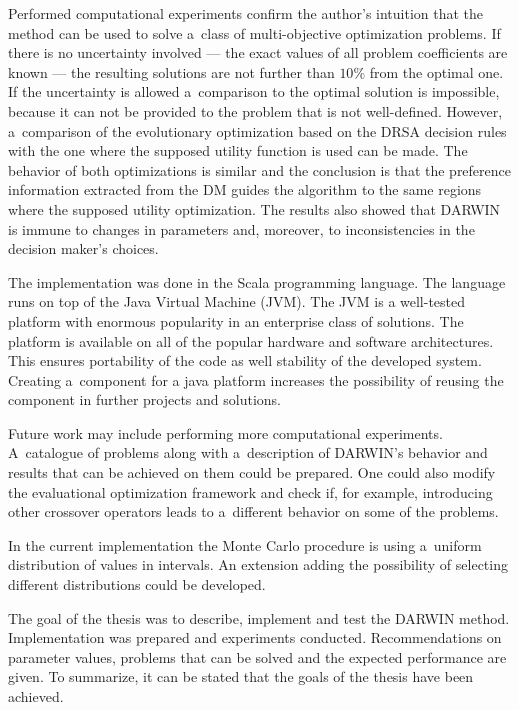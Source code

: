 Performed computational experiments confirm the author's intuition that the
method can be used to solve a~class of multi-objective optimization
problems. If there is no uncertainty involved --- the exact values of all
problem coefficients are known --- the resulting solutions are not further
than $10\%$ from the optimal one. If the uncertainty is allowed a~comparison
to the optimal solution is impossible, because it can not be provided to the
problem that is not well-defined. However, a~comparison of the evolutionary
optimization based on the DRSA decision rules with the one where the supposed
utility function is used can be made. The behavior of both optimizations is
similar and the conclusion is that the preference information extracted from
the DM guides the algorithm to the same regions where the supposed utility
optimization. The results also showed that DARWIN is immune to changes in
parameters and, moreover, to inconsistencies in the decision maker's choices.

The implementation was done in the Scala programming language. The language
runs on top of the Java Virtual Machine (JVM). The JVM is a well-tested
platform with enormous popularity in an enterprise class of solutions. The
platform is available on all of the popular hardware and software
architectures. This ensures portability of the code as well stability of the
developed system. Creating a~component for a java platform increases the
possibility of reusing the component in further projects and solutions.

Future work may include performing more computational experiments. A~catalogue
of problems along with a~description of DARWIN's behavior and results that can
be achieved on them could be prepared. One could also modify the evaluational
optimization framework and check if, for example, introducing other crossover
operators leads to a~different behavior on some of the problems.

In the current implementation the Monte Carlo procedure is using a~uniform
distribution of values in intervals.  An extension adding the possibility of
selecting different distributions could be developed.

The goal of the thesis was to describe, implement and test the DARWIN
method. Implementation was prepared and experiments conducted. Recommendations
on parameter values, problems that can be solved and the expected performance
are given. To summarize, it can be stated that the goals of the thesis have
been achieved.


